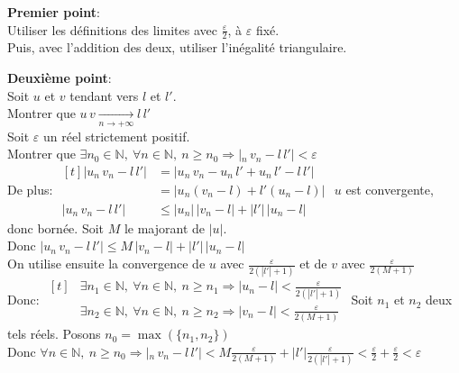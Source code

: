 \documentclass[12pt,twoside,a4paper]{article}
\begin{document}
		\begin{preuve}
			\begin{liste}
				\item\textbf{Premier point}:\\
					Utiliser les définitions des limites avec $\frac{\varepsilon}{2}$, \`a $\varepsilon$ fixé.\\
					Puis, avec l'addition des deux, utiliser l'inégalité triangulaire.
				\item\textbf{Deuxième point}:\\
					Soit $u$ et $v$ tendant vers $l$ et $l'$.\\
					Montrer que $u\,v\mathop{\longrightarrow}\limits_{n\rightarrow+\infty}l\,l'$\\
					Soit $\varepsilon$ un réel strictement positif.\\
					Montrer que $\exists n_0\in\mathbb{N},\ \forall n\in\mathbb{N},\ n\geqslant n_0\Rightarrow|_n\,v_n-l\,l'|<\varepsilon$\\
					De plus: $\begin{aligned}[t]
						|u_n\,v_n-l\,l'|&=|u_n\,v_n-u_n\,l'+u_n\,l'-l\,l'|\\
						                &=|u_n(v_n-l)+l'(u_n-l)|\\
						|u_n\,v_n-l\,l'|&\leqslant|u_n|\,|v_n-l|+|l'|\,|u_n-l|
					\end{aligned}$
					$u$ est convergente, donc bornée. Soit $M$ le majorant de $|u|$.\\
					Donc $|u_n\,v_n-l\,l'|\leqslant M\,|v_n-l|+|l'|\,|u_n-l|$\\
					On utilise ensuite la convergence de $u$ avec $\frac{\varepsilon}{2(|l'|+1)}$ et de $v$ avec $\frac{\varepsilon}{2(M+1)}$\\
					Donc: 
					$\begin{aligned}[t]
						&\exists n_1\in\mathbb{N},\ \forall n\in\mathbb{N},\ n\geqslant n_1\Rightarrow|u_n-l|<\frac{\varepsilon}{2(|l'|+1)}\\
						&\exists n_2\in\mathbb{N},\ \forall n\in\mathbb{N},\ n\geqslant n_2\Rightarrow|v_n-l|<\frac{\varepsilon}{2(M+1)}
					\end{aligned}$
					Soit $n_1$ et $n_2$ deux tels réels. Posons $n_0=\max(\{n_1,n_2\})$\\
					Donc $\forall n\in\mathbb{N},\ n\geqslant n_0\Rightarrow|_n\,v_n-l\,l'|<M\frac{\varepsilon}{2(M+1)}+|l'|\frac{\varepsilon}{2(|l'|+1)}<\frac{\varepsilon}{2}+\frac{\varepsilon}{2}<\varepsilon$\\\\

\end{liste}
\end{preuve}
\end{document}
